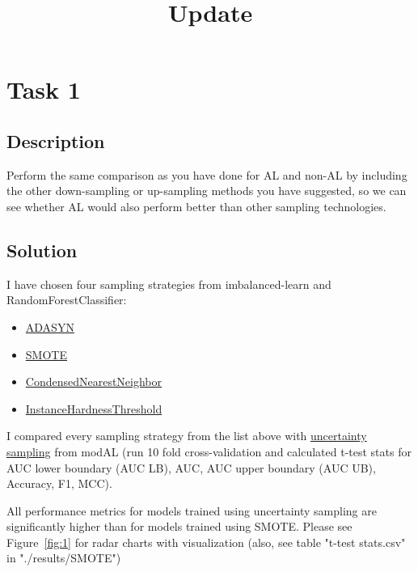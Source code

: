 \documentclass[a4paper,10pt]{article}
\title{Update}
\begin{document}
\maketitle

\tableofcontents

\medskip


\section{Task 1}
\subsection{Description}
Perform the same comparison as you have done for AL and non-AL by including the other down-sampling or up-sampling methods you have suggested, so we can see whether AL would also perform better than other sampling technologies.

\subsection{Solution}
I have chosen four sampling strategies from imbalanced-learn and RandomForestClassifier:
\begin{itemize}
    \item \href{https://imbalanced-learn.readthedocs.io/en/stable/generated/imblearn.over_sampling.ADASYN.html}{ADASYN}
    \item \href{https://imbalanced-learn.readthedocs.io/en/stable/generated/imblearn.over_sampling.SMOTE.html}{SMOTE}
    \item \href{https://imbalanced-learn.readthedocs.io/en/stable/generated/imblearn.under_sampling.CondensedNearestNeighbour.html}{CondensedNearestNeighbor}
    \item \href{https://imbalanced-learn.readthedocs.io/en/stable/generated/imblearn.under_sampling.InstanceHardnessThreshold.html}{InstanceHardnessThreshold}
\end{itemize}

I compared every sampling strategy from the list above with \href{https://modal-python.readthedocs.io/en/latest/content/apireference/uncertainty.html}{uncertainty sampling} from modAL (run 10 fold cross-validation and calculated t-test stats for AUC lower boundary (AUC LB), AUC, AUC upper boundary (AUC UB), Accuracy, F1, MCC). 

All performance metrics for models trained using uncertainty sampling are significantly higher than for models trained using SMOTE. Please see Figure~\ref{fig:1} for radar charts with visualization (also, see table "t-test stats.csv" in "./results/SMOTE")
\end{document}
